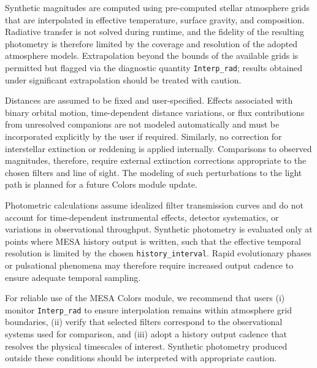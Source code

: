 \documentclass[linenumbers,apj,twocolumn, floatfix]{aastex701}
\begin{document}
Synthetic magnitudes are computed using pre-computed stellar atmosphere grids that are interpolated in effective temperature, surface gravity, and composition. Radiative transfer is not solved during runtime, and the fidelity of the resulting photometry is therefore limited by the coverage and resolution of the adopted atmosphere models. Extrapolation beyond the bounds of the available grids is permitted but flagged via the diagnostic quantity \texttt{Interp\_rad}; results obtained under significant extrapolation should be treated with caution.

Distances are assumed to be fixed and user-specified. Effects associated with binary orbital motion, time-dependent distance variations, or flux contributions from unresolved companions are not modeled automatically and must be incorporated explicitly by the user if required. Similarly, no correction for interstellar extinction or reddening is applied internally. Comparisons to observed magnitudes, therefore, require external extinction corrections appropriate to the chosen filters and line of sight. The modeling of such perturbations to the light path is planned for a future Colors module update. 

Photometric calculations assume idealized filter transmission curves and do not account for time-dependent instrumental effects, detector systematics, or variations in observational throughput. Synthetic photometry is evaluated only at points where MESA history output is written, such that the effective temporal resolution is limited by the chosen \texttt{history\_interval}. Rapid evolutionary phases or pulsational phenomena may therefore require increased output cadence to ensure adequate temporal sampling.


For reliable use of the MESA Colors module, we recommend that users (i) monitor \texttt{Interp\_rad} to ensure interpolation remains within atmosphere grid boundaries, (ii) verify that selected filters correspond to the observational systems used for comparison, and (iii) adopt a history output cadence that resolves the physical timescales of interest. Synthetic photometry produced outside these conditions should be interpreted with appropriate caution.
\end{document}
